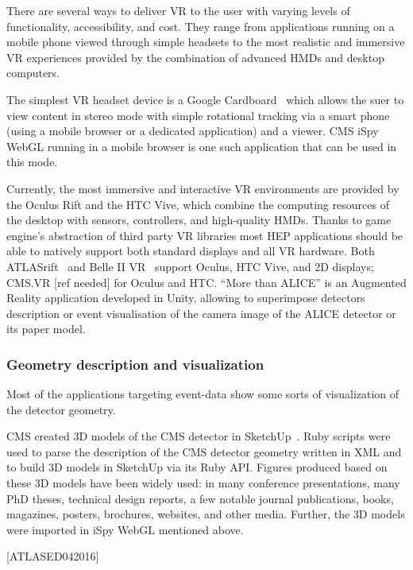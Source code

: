 \documentclass[12pt,a4paper]{article}
\begin{document}
There are several ways to deliver VR to the user with varying levels of functionality, accessibility, and cost. They range from
applications running on a mobile phone viewed through simple headsets to the most realistic and immersive VR experiences provided
by the combination of advanced HMDs and desktop computers.

The simplest VR headset device is a Google Cardboard~\cite{GoogleCardboard} which allows the suer to view content in stereo mode with
simple rotational tracking via a smart phone (using a mobile browser or a dedicated application) and a viewer. CMS iSpy WebGL running
in a mobile browser is one such application that can be used in this mode.

Currently, the most immersive and interactive VR environments are provided by the Oculus Rift and the HTC Vive, which combine the
computing resources of the desktop with sensors, controllers, and high-quality HMDs. Thanks to game engine’s abstraction of third
party VR libraries most HEP applications should be able to natively support both standard displays and all VR hardware.
Both ATLASrift~\cite{ATLASRift} and Belle II VR~\cite{BelleIIVR} support Oculus, HTC Vive, and 2D displays; CMS.VR [ref needed] for
Oculus and HTC. “More than ALICE” is an Augmented Reality application developed in Unity, allowing to superimpose detectors description or event
visualisation of the camera image of the ALICE detector or its paper model.

\hypertarget{geometry-description}{%
\subsubsection{Geometry description and visualization}\label{geometry-description}}

Most of the applications targeting event-data show some sorts of visualization of the detector geometry.

CMS created 3D models of the CMS detector in SketchUp~\cite{CMSSketchUp}. Ruby scripts were used to parse the
description of the CMS detector geometry written in XML and to build 3D models in SketchUp via its Ruby API.
Figures produced based on these 3D models have been widely used: in many conference presentations, many PhD theses,
technical design reports, a few notable journal publications, books, magazines, posters, brochures, websites, and other media.
Further, the 3D models were imported in iSpy WebGL mentioned above.

[ATLASED042016]
\end{document}
